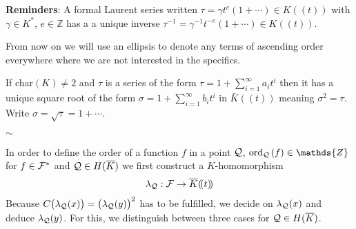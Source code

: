 \documentclass[english,11pt,a4paper]{article}
\begin{document}
\textbf{Reminders}: A formal Laurent series written $\tau = \gamma t^e (1 + \cdots)\in K (\! (t)\! )$ with $\gamma \in K^*$, $e \in \mathds{Z}$ has a a unique inverse $\tau^{-1} = \gamma^{-1} t^{-e} (1 + \cdots) \in K (\! (t)\! )$.

From now on we will use an ellipsis to denote any terms of ascending order everywhere where we are not interested in the specifics.

If char$(K) \neq 2$ and $\tau$ is a series of the form $\tau = 1 + \sum_{i = 1}^{\infty} a_i t^i$ then it has a unique square root of the form $\sigma = 1+\sum_{i = 1}^{\infty} b_i t^i$ in $\bar K (\! (t)\! )$ meaning $\sigma^2 = \tau$. Write $\sigma = \sqrt \tau = 1 + \cdots$.

\vspace{-3mm}
\begin{center}
$\sim$
\end{center}

In order to define the order of a function $f$ in a point $\mathcal{Q}$, $\ordq (f) \in \mathds{Z}$ for $f \in \mathcal{F}^*$ and $\mathcal{Q} \in H(\overline K)$ we first construct a $K$-homomorphism
\begin{align*}
  \lambda_{\mathcal{Q}}: \mathcal{F} \rightarrow \overline K (\! (t)\! )
\end{align*}
Because $C\big(\lambda_{\mathcal{Q}}(x)\big)=\big(\lambda_{\mathcal{Q}}(y)\big)^2$ has to be fulfilled, we decide on $\lambda_{\mathcal{Q}}(x)$ and deduce $\lambda_{\mathcal{Q}}(y)$. For this, we distinguish between three cases for $\mathcal{Q} \in H(\overline K)$.

\newpage
\end{document}
